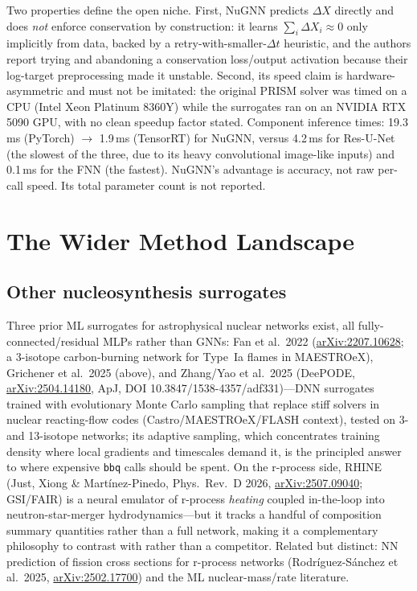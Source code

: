 \documentclass[11pt,a4paper]{article}
\newcommand{\code}[1]{\texttt{#1}}
\newcommand{\arxiv}[1]{\href{https://arxiv.org/abs/#1}{arXiv:#1}}
\begin{document}
Two properties define the open niche. First, NuGNN predicts $\Delta X$ directly and does \emph{not} enforce conservation by construction: it learns $\sum_i \Delta X_i \approx 0$ only implicitly from data, backed by a retry-with-smaller-$\Delta t$ heuristic, and the authors report trying and abandoning a conservation loss/output activation because their log-target preprocessing made it unstable. Second, its speed claim is hardware-asymmetric and must not be imitated: the original PRISM solver was timed on a CPU (Intel Xeon Platinum 8360Y) while the surrogates ran on an NVIDIA RTX 5090 GPU, with no clean speedup factor stated. Component inference times: 19.3\,ms (PyTorch) $\to$ 1.9\,ms (TensorRT) for NuGNN, versus 4.2\,ms for Res-U-Net (the slowest of the three, due to its heavy convolutional image-like inputs) and 0.1\,ms for the FNN (the fastest). NuGNN's advantage is accuracy, not raw per-call speed. Its total parameter count is not reported.

\section{The Wider Method Landscape}

\subsection{Other nucleosynthesis surrogates}

Three prior ML surrogates for astrophysical nuclear networks exist, all fully-connected/residual MLPs rather than GNNs: Fan et al.\ 2022 (\arxiv{2207.10628}; a 3-isotope carbon-burning network for Type~Ia flames in MAESTROeX), Grichener et al.\ 2025 (above), and Zhang/Yao et al.\ 2025 (DeePODE, \arxiv{2504.14180}, ApJ, DOI 10.3847/1538-4357/adf331)---DNN surrogates trained with evolutionary Monte Carlo sampling that replace stiff solvers in nuclear reacting-flow codes (Castro/MAESTROeX/FLASH context), tested on 3- and 13-isotope networks; its adaptive sampling, which concentrates training density where local gradients and timescales demand it, is the principled answer to where expensive \code{bbq} calls should be spent. On the r-process side, RHINE (Just, Xiong \& Mart\'inez-Pinedo, Phys.\ Rev.\ D 2026, \arxiv{2507.09040}; GSI/FAIR) is a neural emulator of r-process \emph{heating} coupled in-the-loop into neutron-star-merger hydrodynamics---but it tracks a handful of composition summary quantities rather than a full network, making it a complementary philosophy to contrast with rather than a competitor. Related but distinct: NN prediction of fission cross sections for r-process networks (Rodr\'iguez-S\'anchez et al.\ 2025, \arxiv{2502.17700}) and the ML nuclear-mass/rate literature.
\end{document}
